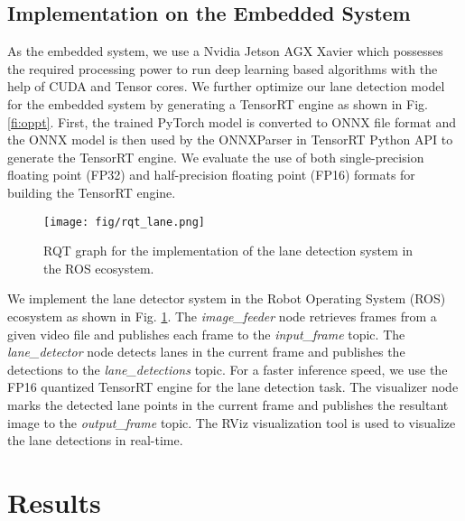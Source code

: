 \documentclass[conference]{IEEEtran}
\begin{document}
\subsection{Implementation on the Embedded System}
\label{ssec:embedded}

As the embedded system, we use a Nvidia Jetson AGX Xavier which possesses the required processing power to run deep learning based algorithms with the help of CUDA and Tensor cores. We further optimize our lane detection model for the embedded system by generating a TensorRT engine as shown in Fig. \ref{fi:oppt}. First, the trained PyTorch model is converted to ONNX file format and the ONNX model is then used by the ONNXParser in TensorRT Python API to generate the TensorRT engine. We evaluate the use of both single-precision floating point (FP32) and half-precision floating point (FP16) formats for building the TensorRT engine. 




\begin{figure}[t]
    \centering
\texttt{[image: fig/rqt\_lane.png]}

\caption{RQT graph for the implementation of the lane detection system in the ROS ecosystem.}
    \vspace{-0.3cm}
    \label{fig:rqt_graph}
\end{figure}

We implement the lane detector system in the Robot Operating System (ROS) \cite{ros} ecosystem as shown in Fig. \ref{fig:rqt_graph}.  The \textit{image\_feeder} node retrieves frames from a given video file and publishes each frame to the \textit{input\_frame} topic. The \textit{lane\_detector} node detects lanes in the current frame and publishes the detections to the \textit{lane\_detections} topic. For a faster inference speed, we use the FP16 quantized TensorRT engine for the lane detection task. The visualizer node marks the detected lane points in the current frame and publishes the resultant image to the \textit{output\_frame} topic. The RViz visualization tool is used to visualize the lane detections in real-time.





\section{Results}
\label{sec:results}

\normalsize
\end{document}
